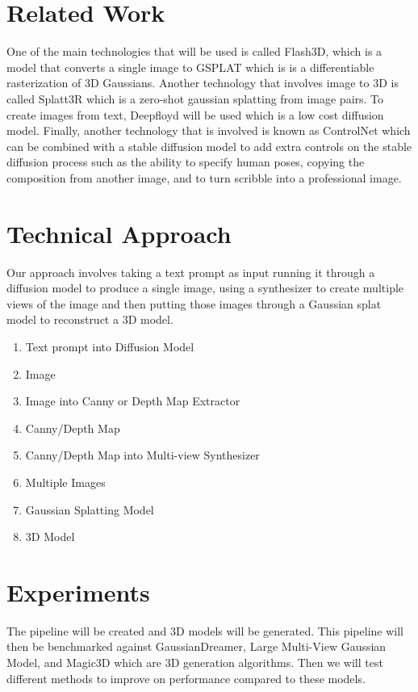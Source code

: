 \documentclass[10pt,twocolumn,letterpaper]{article}
\begin{document}
\section{Related Work}

One of the main technologies that will be used is called Flash3D, which  is a model that converts a single image to GSPLAT which is is a differentiable rasterization of 3D Gaussians. Another technology that involves image to 3D is called Splatt3R which is a zero-shot gaussian splatting from image pairs. To create images from text, Deepfloyd will be used which is a low cost diffusion model. Finally, another technology that is involved is known as ControlNet which can be combined with a stable diffusion model to add extra controls on the stable diffusion process such as the ability to specify human poses, copying the composition from another image, and to turn scribble into a professional image.

\section{Technical Approach}


Our approach involves taking a text prompt as input running it through a diffusion model to produce a single image, using a synthesizer to create multiple views of the image and then putting those images through a Gaussian splat model to reconstruct a 3D model.

\begin{enumerate}
\item Text prompt into Diffusion Model
\item Image
\item Image into Canny or Depth Map Extractor
\item Canny/Depth Map
\item Canny/Depth Map into Multi-view Synthesizer
\item Multiple Images
\item Gaussian Splatting Model
\item 3D Model
\end{enumerate}

\section{Experiments}


The pipeline will be created and 3D models will be generated. This pipeline will then be benchmarked against GaussianDreamer, Large Multi-View Gaussian Model, and Magic3D which are 3D generation algorithms. Then we will test different methods to improve on performance compared to these models.
\end{document}
